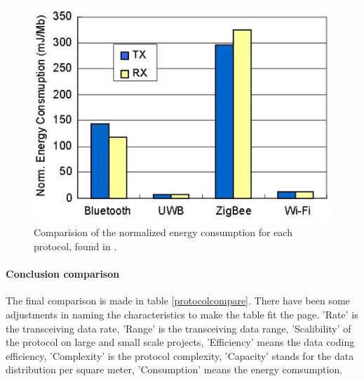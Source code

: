 \documentclass[10pt,a4paper]{article}
\begin{document}
\begin{figure}[H]
   \centering
   \includegraphics[width=1\textwidth]{images/protocolenergynormalized.png}
   \caption{Comparision of the normalized energy consumption for each protocol, found in \cite{comparitivestudywirelessprotocols}.}
   \label{fig:protocolenergynormalized}
\end{figure}


\paragraph{Conclusion comparison}
The final comparison is made in table \ref{protocolcompare}. There have been some adjustments in naming the characteristics to make the table fit the page. 'Rate' is the transceiving data rate, 'Range' is the transceiving data range, 'Scalibility' of the protocol on large and small scale projects, 'Efficiency' means the data coding efficiency, 'Complexity' is the protocol complexity, 'Capacity' stands for the data distribution per square meter, 'Consumption' means the energy comsumption.
\end{document}
